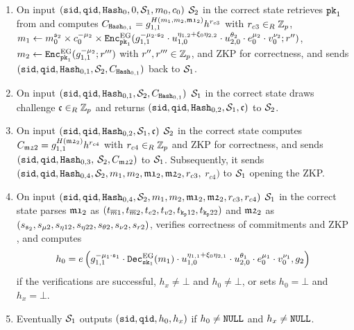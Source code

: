 \begin{enumerate}
	    \item On input $(\mathtt{sid},\mathtt{qid},\mathtt{Hash}_0,0,\mathcal{S}_1,m_0,c_0)$ $\mathcal{S}_2$ in the correct state retrieves $\mathtt{pk}_1$ from \Fca and computes
	      $C_{\mathtt{Hash}_{0,1}}=g_{1,1}^{H(m_{1},m_{2},\mathfrak{m1}_2)} h^{r_{c3}}$
	      with $r_{c3}\in_R\mathbb{Z}_p$,
	      $m_{1}\gets m_0^{\share_2} \times c_0^{-\mu_2} \times \Enc_{\pk_1}^\EG(g_{1,1}^{-\mu_2\cdot {\share_2}} \cdot u_{1,0}^{\eta_{1,2}+\xi_0\eta_{2,2}} \cdot u_{2,0}^{\theta_2} \cdot e_0^{\mu_2} \cdot v_0^{\nu_2}; r'')$, $m_{2}\gets \mathtt{Enc}_{\mathtt{pk}_1}^\mathrm{EG}(g_{1,1}^{-\mu_2}; r''')$ with $r'',r'''\in\mathbb{Z}_p$, and \ac{ZKP} for correctness,
	      and sends $(\mathtt{sid},\mathtt{qid},\mathtt{Hash}_{0,1},\mathcal{S}_2,C_{\mathtt{Hash}_{0,1}})$ back to $\mathcal{S}_1$.
	      
	    \item On input $(\mathtt{sid},\mathtt{qid},\mathtt{Hash}_{0,1},\mathcal{S}_2,C_{\mathtt{Hash}_{0,1}})$ $\mathcal{S}_1$ in the correct state draws challenge $\mathfrak{c}\in_R\mathbb{Z}_p$ and returns $(\mathtt{sid},\mathtt{qid},\mathtt{Hash}_{0,2},\mathcal{S}_1,\mathfrak{c})$ to $\mathcal{S}_2$. 
	    
	    \item On input $(\mathtt{sid},\mathtt{qid},\mathtt{Hash}_{0,2},\mathcal{S}_1,\mathfrak{c})$ $\mathcal{S}_2$ in the correct state computes
	    $C_{\mathfrak{m2}2}=g_{1,1}^{H(\mathfrak{m2}_{2})} h^{r_{c4}}$ with $r_{c4}\in_R\mathbb{Z}_p$ and \ac{ZKP} for correctness,
	    and sends $(\mathtt{sid},\mathtt{qid},\mathtt{Hash}_{0,3},$ $\mathcal{S}_2,C_{\mathfrak{m2}2})$ to $\mathcal{S}_1$.
	    Subsequently, it sends $(\mathtt{sid},\mathtt{qid},\mathtt{Hash}_{0,4},\mathcal{S}_2, m_1, m_2, \mathfrak{m1}_2, \mathfrak{m2}_2, r_{c3},$ $r_{c4})$ to $\mathcal{S}_1$ opening the \ac{ZKP}.
	    
	    \item On input $(\mathtt{sid},\mathtt{qid},\mathtt{Hash}_{0,4},\mathcal{S}_2, m_1, m_2, \mathfrak{m1}_2, \mathfrak{m2}_2, r_{c3}, r_{c4})$ $\mathcal{S}_1$ in the correct state parses $\mathfrak{m1}_{2}$ as $(t_{\overline{m}1}, t_{\overline{m}2}, t_{e2}, t_{v2}, t_{\mathtt{k_p}12}, t_{\mathtt{k_p}22})$ and $\mathfrak{m2}_{2}$ as $(s_{\mathfrak{s}_2}, s_{\mu2}, s_{\eta12}, s_{\eta22}, s_{\theta2}, s_{\nu2}, s_{r2})$, verifies correctness of commitments and \ac{ZKP} , and computes
	      \[h_0 = e\left( g_{1,1}^{-\mu_1\cdot \mathfrak{s}_1} \cdot \mathtt{Dec}_{\mathtt{sk}_1}^\mathrm{EG}(m_1) \cdot u_{1,0}^{\eta_{1,1}+\xi_0\eta_{2,1}} \cdot u_{2,0}^{\theta_1} \cdot e_0^{\mu_1} \cdot v_0^{\nu_1}, g_2 \right)\] 
	      if the verifications are successful, $h_x\not=\bot$ and $h_0\not=\bot$, or sets $h_0=\bot$ and $h_x=\bot$.
	    
	    \item Eventually $\mathcal{S}_1$ outputs $(\mathtt{sid}, \mathtt{qid}, h_0, h_x)$ if $h_0\not=\mathtt{NULL}$ and $h_x\not=\mathtt{NULL}$.
	  \end{enumerate}
	  	
